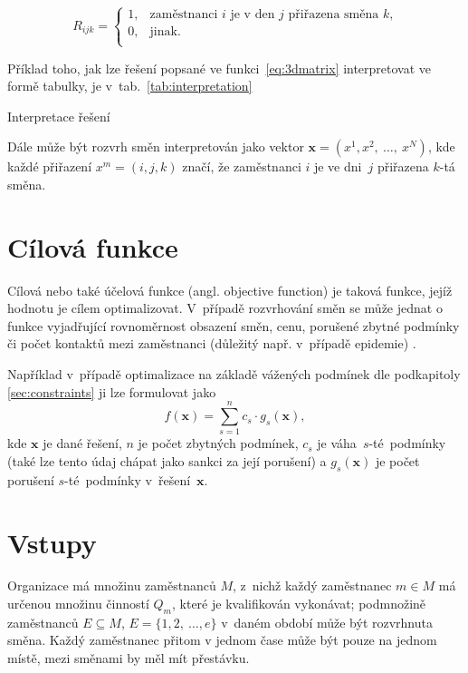\documentclass[twoside]{ctuthesis}
\begin{document}
\begin{enumerate}[label=\textbf{O\arabic*.}]
\begin{equation}
	\label{eq:3dmatrix}
	R_{ijk} =
	\begin{cases}
		1, & \mbox{zaměstnanci $i$ je v den $j$ přiřazena směna $k$,} \\
		0, & \mbox{jinak.}\\
	\end{cases}
\end{equation}

Příklad toho, jak lze řešení popsané ve funkci~\ref{eq:3dmatrix} interpretovat ve formě tabulky, je v~tab.~\ref{tab:interpretation}
\begin{table}[h]
	
	\caption{Interpretace řešení}
	\label{tab:interpretation}
\end{table}

Dále může být rozvrh směn interpretován jako vektor $\boldsymbol{x} = (x^1, x^2,~\ldots,~x^N)$, kde každé přiřazení $x^m = (i, j, k)$ značí, že zaměstnanci $i$ je ve dni~$j$ přiřazena $k$-tá směna. \cite{awadallah2015hybrid}

\section{Cílová funkce}
\label{sec:objective}
Cílová nebo také účelová funkce (angl. objective function) je taková funkce, jejíž hodnotu je cílem optimalizovat. V~případě rozvrhování směn se může jednat o funkce vyjadřující rovnoměrnost obsazení směn, cenu, porušené zbytné podmínky \cite{blochliger2004modeling} či počet kontaktů mezi zaměstnanci (důležitý např. v~případě epidemie) \cite{zucchi2020personnel}.

Například v~případě optimalizace na základě vážených podmínek dle podkapitoly \ref{sec:constraints} ji lze formulovat jako
\begin{equation}
	f(\boldsymbol{x}) = \sum_{s = 1}^n c_s \cdot g_s(\boldsymbol{x}),
\end{equation}
kde $\boldsymbol{x}$ je dané řešení, $n$ je počet zbytných podmínek, $c_s$ je váha~$s$-té~podmínky (také lze tento údaj chápat jako sankci za její porušení) a $g_s(\boldsymbol{x})$ je počet porušení $s$-té~podmínky v~řešení~$\boldsymbol{x}$. \cite{awadallah2015hybrid}

\section{Vstupy}
Organizace má množinu zaměstnanců $M$, z~nichž každý zaměstnanec $m \in M$ má určenou množinu činností $Q_m$, které je kvalifikován vykonávat; podmnožině zaměstnanců $E \subseteq M$, $E = \{ 1, 2,~\ldots, e \}$ v~daném období může být rozvrhnuta směna. Každý zaměstnanec přitom v jednom čase může být pouze na jednom místě, mezi směnami by měl mít přestávku.


\end{enumerate}
\end{document}
